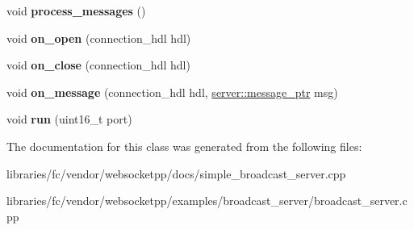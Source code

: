 \begin{DoxyCompactItemize}
\item 
\mbox{\label{classbroadcast__server_aab1bd3f376f3d5242660b686c6b45b40}} 
void {\bfseries process\+\_\+messages} ()
\item 
\mbox{\label{classbroadcast__server_a20d3e5b15b9e916f6772d3e1137327c0}} 
void {\bfseries on\+\_\+open} (connection\+\_\+hdl hdl)
\item 
\mbox{\label{classbroadcast__server_aba6fc18682e45978ae64ed1667deb44e}} 
void {\bfseries on\+\_\+close} (connection\+\_\+hdl hdl)
\item 
\mbox{\label{classbroadcast__server_aa56cb8528f19afc3b1a2712d07d0b499}} 
void {\bfseries on\+\_\+message} (connection\+\_\+hdl hdl, \mbox{\hyperlink{classwebsocketpp_1_1endpoint_a585ecbbfd9689d4e4229e4c8378bd672}{server\+::message\+\_\+ptr}} msg)
\item 
\mbox{\label{classbroadcast__server_af7c28eeb788bf2451364e76a02615cac}} 
void {\bfseries run} (uint16\+\_\+t port)
\end{DoxyCompactItemize}


The documentation for this class was generated from the following files\+:\begin{DoxyCompactItemize}
\item 
libraries/fc/vendor/websocketpp/docs/simple\+\_\+broadcast\+\_\+server.\+cpp\item 
libraries/fc/vendor/websocketpp/examples/broadcast\+\_\+server/broadcast\+\_\+server.\+cpp\end{DoxyCompactItemize}
